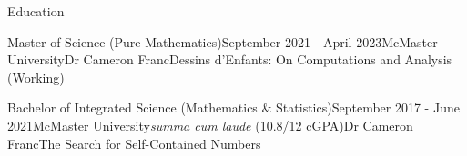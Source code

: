 \begin{rSection}{Education}

\begin{edSubsectionFull}{Master of Science (Pure Mathematics)}{September 2021 - April 2023}{McMaster University}{}{Dr Cameron Franc}{Dessins d'Enfants: On Computations and Analysis (Working)}
\end{edSubsectionFull}



\begin{edSubsectionHonours}{Bachelor of Integrated Science (Mathematics \& Statistics)}{September 2017 - June 2021}{McMaster University}{\textit{summa cum laude} (10.8/12 cGPA)}{Dr Cameron Franc}{The Search for Self-Contained Numbers}
\end{edSubsectionHonours}




\end{rSection}